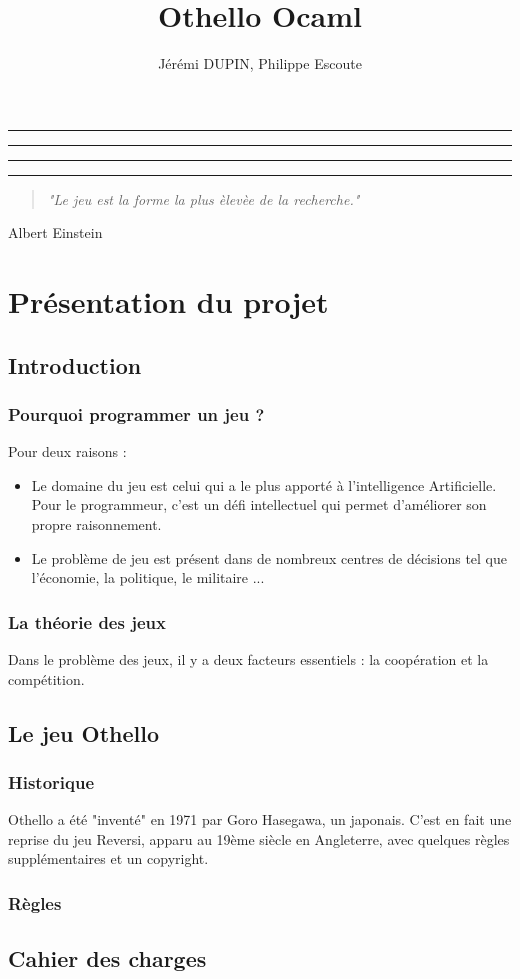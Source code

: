 \documentclass[10pt,a4paper]{report}
\author{Jérémi DUPIN, Philippe Escoute}
\title{Othello Ocaml}
\makeatletter
\renewcommand{\maketitle}{\begin{titlepage}%
    \let\footnotesize\small
    \let\footnoterule\relax
    \parindent \z@
    \reset@font
    \null
    \vskip 50\p@
    \begin{center}
      \hrule
      \vskip 1pt 
      \hrule
      \vskip 1pt
      {\huge \bfseries \strut \@title \strut}\par
      \vskip 1pt
      \hrule
      \vskip 1pt
      \hrule
    \end{center}
    \vskip 50\p@ 
    \begin{center}
      \Large \@author \par
    \end{center}
    \vskip 30\p@
    \begin{center}
      \Large \@date \par
    \end{center}
    \vskip 180 \p@
    \begin{center}
    	\begin{quote}
    		\textit{"Le jeu est la forme la plus \`{e}lev\`{e}e de la recherche."}
    	\end{quote}
    \end{center}
    \begin{flushright}
    Albert Einstein
    \end{flushright}
    \vfil
    \null
  \end{titlepage}%
  \setcounter{footnote}{0}%
}
\makeatother
\begin{document}
\maketitle
\part{Présentation du projet}
\chapter{Introduction}
\section*{Pourquoi programmer un jeu ?}
Pour deux raisons :
\begin{itemize}
\item Le domaine du jeu est celui qui a le plus apporté à l'intelligence Artificielle. Pour le programmeur, c'est un défi intellectuel qui permet d'améliorer son propre raisonnement.
\item Le problème de jeu est présent dans de nombreux centres de décisions tel que l'économie, la politique, le militaire ...
\end{itemize}

\section*{La théorie des jeux}
Dans le problème des jeux, il y a deux facteurs essentiels : la coopération et la compétition.

\chapter{Le jeu Othello}
\section*{Historique}
Othello a été "inventé" en 1971 par Goro Hasegawa, un japonais. C'est en fait une reprise du jeu Reversi, apparu au 19ème siècle en Angleterre, avec quelques règles supplémentaires et un copyright.
\section*{Règles}

\chapter{Cahier des charges}
\end{document}
